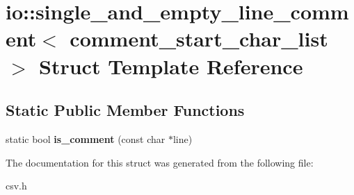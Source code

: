\section{io\+:\+:single\+\_\+and\+\_\+empty\+\_\+line\+\_\+comment$<$ comment\+\_\+start\+\_\+char\+\_\+list $>$ Struct Template Reference}
\label{structio_1_1single__and__empty__line__comment}
\subsection*{Static Public Member Functions}
\begin{DoxyCompactItemize}
\item 
static bool {\bfseries is\+\_\+comment} (const char $\ast$line)\label{structio_1_1single__and__empty__line__comment_a93a1556dfe4d7e6e3a674d576c4b30f4}

\end{DoxyCompactItemize}


The documentation for this struct was generated from the following file\+:\begin{DoxyCompactItemize}
\item 
csv.\+h\end{DoxyCompactItemize}
